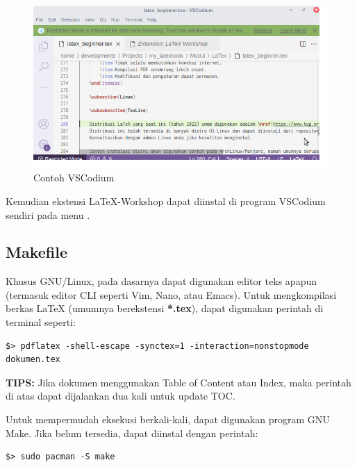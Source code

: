 \documentclass{book} %
\begin{document}
	\begin{figure}[!ht]
		\centering
		\includegraphics[width=400pt]{images/vscodium}
		\caption{Contoh VSCodium}
	\end{figure}

	Kemudian ekstensi LaTeX-Workshop dapat diinstal di program VSCodium sendiri pada menu .

	\newpage
	\subsection{Makefile}

	Khusus GNU/Linux, pada dasarnya dapat digunakan editor teks apapun (termasuk editor CLI seperti Vim, Nano, atau Emacs).
	Untuk mengkompilasi berkas \LaTeX{} (umumnya berekstensi \textbf{*.tex}), dapat digunakan perintah di terminal seperti:

	\begin{verbatim}
$> pdflatex -shell-escape -synctex=1 -interaction=nonstopmode dokumen.tex
	\end{verbatim}

	\textbf{TIPS:} Jika dokumen menggunakan Table of Content atau Index, maka perintah di atas dapat dijalankan dua kali untuk update TOC.

	Untuk mempermudah eksekusi berkali-kali, dapat digunakan program GNU Make.
	Jika belum tersedia, dapat diinstal dengan perintah:

	\begin{verbatim}
$> sudo pacman -S make
	\end{verbatim}
\end{document}
